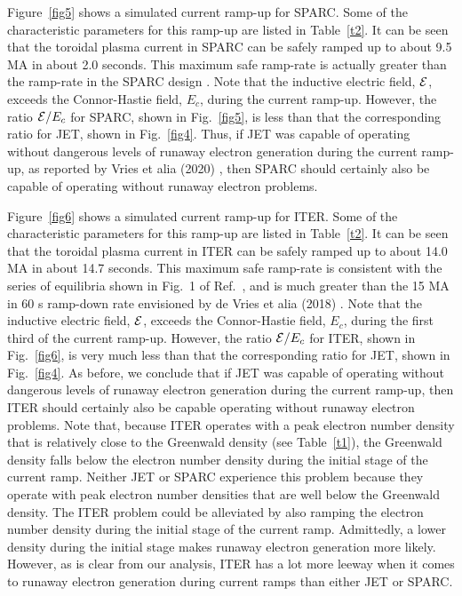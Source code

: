 \documentclass{iopjournal}
\begin{document}
Figure~\ref{fig5} shows a simulated current ramp-up for SPARC. Some of the characteristic  parameters for this ramp-up are listed in Table~\ref{t2}. 
It can be seen that the toroidal plasma current in SPARC can be safely ramped up to about 9.5 MA in about 2.0 seconds. This maximum safe ramp-rate is 
actually greater than the ramp-rate in the SPARC design \cite{creely}. 
Note that the inductive electric field, ${\cal E}$,  exceeds the Connor-Hastie field, $E_c$,  during the current ramp-up. However, the ratio ${\cal E}/E_c$ for SPARC,
shown  in Fig.~\ref{fig5}, is less than that the corresponding ratio for JET,  shown in Fig.~\ref{fig4}. Thus, if JET was capable of
operating without dangerous levels of runaway electron generation during the current ramp-up, as reported by  Vries et alia (2020) \cite{run}, then SPARC
should certainly also be capable of operating without runaway electron problems. 

Figure~\ref{fig6} shows a simulated current ramp-up for ITER. Some of the characteristic  parameters for this ramp-up are listed in Table~\ref{t2}. 
It can be seen that the toroidal plasma current in ITER can be safely ramped up to about 14.0 MA in about 14.7 seconds. This maximum safe ramp-rate is 
consistent with the series of equilibria shown in Fig.~1 of Ref.~\cite{federici}, and is much greater than the 15 MA in 60 s ramp-down rate envisioned by de Vries et alia (2018) \cite{deVries}.
Note that the inductive electric field, ${\cal E}$,  exceeds the Connor-Hastie field, $E_c$,  during the first third of the current ramp-up. However,  the ratio ${\cal E}/E_c$ for ITER, 
shown  in Fig.~\ref{fig6}, is very much less than that the corresponding ratio for JET,  shown in Fig.~\ref{fig4}. As before, we conclude that if JET was capable of
operating without dangerous levels of runaway electron generation during the current ramp-up, then ITER
should certainly also be capable operating without runaway electron problems.  Note that, because ITER operates with a peak electron number density  that is relatively close to the Greenwald density (see Table~\ref{t1}), the Greenwald
density falls below the electron number density during the initial stage of the current ramp. Neither JET or SPARC experience this problem because they operate with peak electron number
densities that are well
below the Greenwald density. The ITER problem could be alleviated by also ramping the electron number density during the initial stage of the current ramp. Admittedly, a lower density during the initial
stage  makes
runaway electron generation more likely. However, as is clear from our analysis, ITER has a lot more leeway when it comes to runaway electron generation during
current ramps than either JET or SPARC. 
\end{document}
